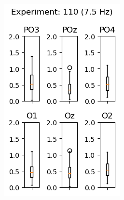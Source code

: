 \begin{figure}[ht]
\begin{subfigure}{0.25\linewidth}
        \includegraphics[width=\linewidth]{images/appendix/11075.png}
        \label{fig:11075}
    \end{subfigure}
    

\end{figure}
